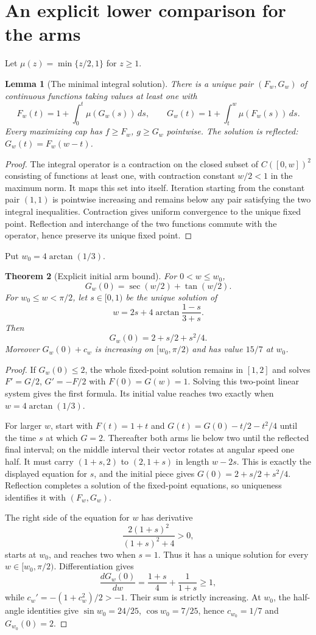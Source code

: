 \documentclass[11pt]{article}
\newtheorem{theorem}{Theorem}[section]
\newtheorem{lemma}[theorem]{Lemma}
\begin{document}
\section{An explicit lower comparison for the arms}
Let $\mu(z)=\min\{z/2,1\}$ for $z\ge1$.
\begin{lemma}[The minimal integral solution]\label{lem:minimal}
There is a unique pair $(F_w,G_w)$ of continuous functions taking values at least one with
\[
 F_w(t)=1+\int_0^t\mu(G_w(s))\,ds,\qquad
 G_w(t)=1+\int_t^w\mu(F_w(s))\,ds.
\]
Every maximizing cap has $f\ge F_w$, $g\ge G_w$ pointwise. The solution is reflected: $G_w(t)=F_w(w-t)$.
\end{lemma}
\begin{proof}
The integral operator is a contraction on the closed subset of $C([0,w])^2$ consisting of functions at least one, with contraction constant $w/2<1$ in the maximum norm. It maps this set into itself. Iteration starting from the constant pair $(1,1)$ is pointwise increasing and remains below any pair satisfying the two integral inequalities. Contraction gives uniform convergence to the unique fixed point. Reflection and interchange of the two functions commute with the operator, hence preserve its unique fixed point.
\end{proof}

Put $w_0=4\arctan(1/3)$.
\begin{theorem}[Explicit initial arm bound]\label{thm:initial}
For $0<w\le w_0$,
\[
 G_w(0)=\sec(w/2)+\tan(w/2).
\]
For $w_0\le w<\pi/2$, let $s\in[0,1)$ be the unique solution of
\[
 w=2s+4\arctan\frac{1-s}{3+s}.
\]
Then
\[
 G_w(0)=2+s/2+s^2/4.
\]
Moreover $G_w(0)+c_w$ is increasing on $[w_0,\pi/2)$ and has value $15/7$ at $w_0$.
\end{theorem}
\begin{proof}
If $G_w(0)\le2$, the whole fixed-point solution remains in $[1,2]$ and solves $F'=G/2$, $G'=-F/2$ with $F(0)=G(w)=1$. Solving this two-point linear system gives the first formula. Its initial value reaches two exactly when $w=4\arctan(1/3)$.

For larger $w$, start with $F(t)=1+t$ and $G(t)=G(0)-t/2-t^2/4$ until the time $s$ at which $G=2$. Thereafter both arms lie below two until the reflected final interval; on the middle interval their vector rotates at angular speed one half. It must carry $(1+s,2)$ to $(2,1+s)$ in length $w-2s$. This is exactly the displayed equation for $s$, and the initial piece gives $G(0)=2+s/2+s^2/4$. Reflection completes a solution of the fixed-point equations, so uniqueness identifies it with $(F_w,G_w)$.

The right side of the equation for $w$ has derivative
\[
 \frac{2(1+s)^2}{(1+s)^2+4}>0,
\]
starts at $w_0$, and reaches two when $s=1$. Thus it has a unique solution for every $w\in[w_0,\pi/2)$. Differentiation gives
\[
 \frac{dG_w(0)}{dw}=\frac{1+s}{4}+\frac1{1+s}\ge1,
\]
while $c_w'=-(1+c_w^2)/2>-1$. Their sum is strictly increasing. At $w_0$, the half-angle identities give $\sin w_0=24/25$, $\cos w_0=7/25$, hence $c_{w_0}=1/7$ and $G_{w_0}(0)=2$.
\end{proof}
\end{document}
